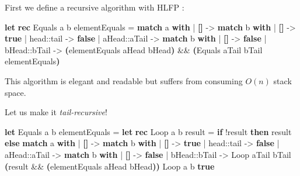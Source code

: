 \documentclass[
]{book}
\newenvironment{Shaded}{\begin{snugshade}}{\end{snugshade}}
\newcommand{\KeywordTok}[1]{\textcolor[rgb]{0.13,0.29,0.53}{\textbf{#1}}}
\newcommand{\NormalTok}[1]{#1}
\newcommand{\OperatorTok}[1]{\textcolor[rgb]{0.81,0.36,0.00}{\textbf{#1}}}
\begin{document}
First we define a recursive algorithm with HLFP :

\begin{Shaded}
\begin{Highlighting}[]
\KeywordTok{let} \KeywordTok{rec}\NormalTok{ Equals a b elementEquals = }
    \KeywordTok{match}\NormalTok{ a }\KeywordTok{with} 
\NormalTok{    | }\OperatorTok{[]}\NormalTok{ {-}\textgreater{} }\KeywordTok{match}\NormalTok{ b }\KeywordTok{with} 
\NormalTok{        | }\OperatorTok{[]}\NormalTok{ {-}\textgreater{} }\KeywordTok{true} 
\NormalTok{        | head::tail {-}\textgreater{} }\KeywordTok{false} 
\NormalTok{    | aHead::aTail {-}\textgreater{} }\KeywordTok{match}\NormalTok{ b }\KeywordTok{with} 
\NormalTok{        | }\OperatorTok{[]}\NormalTok{ {-}\textgreater{} }\KeywordTok{false} 
\NormalTok{        | bHead::bTail {-}\textgreater{} }\OperatorTok{(}\NormalTok{elementEquals aHead bHead}\OperatorTok{)}\NormalTok{ \&\& }\OperatorTok{(}\NormalTok{Equals aTail bTail elementEquals}\OperatorTok{)}
\end{Highlighting}
\end{Shaded}

This algorithm is elegant and readable but suffers from consuming \(O(n)\) stack space.

Let us make it \emph{tail-recursive}!

\begin{Shaded}
\begin{Highlighting}[]
\KeywordTok{let}\NormalTok{ Equals a b elementEquals = }
    \KeywordTok{let} \KeywordTok{rec}\NormalTok{ Loop a b result = }
        \KeywordTok{if}\NormalTok{ !result }\KeywordTok{then}\NormalTok{ result }\KeywordTok{else} 
            \KeywordTok{match}\NormalTok{ a }\KeywordTok{with} 
\NormalTok{            | }\OperatorTok{[]}\NormalTok{ {-}\textgreater{} }\KeywordTok{match}\NormalTok{ b }\KeywordTok{with} 
\NormalTok{                | }\OperatorTok{[]}\NormalTok{ {-}\textgreater{} }\KeywordTok{true} 
\NormalTok{                | head::tail {-}\textgreater{} }\KeywordTok{false} 
\NormalTok{            | aHead::aTail {-}\textgreater{} }\KeywordTok{match}\NormalTok{ b }\KeywordTok{with} 
\NormalTok{                | }\OperatorTok{[]}\NormalTok{ {-}\textgreater{} }\KeywordTok{false} 
\NormalTok{                | bHead::bTail {-}\textgreater{} Loop aTail bTail }\OperatorTok{(}\NormalTok{result \&\& }\OperatorTok{(}\NormalTok{elementEquals aHead bHead}\OperatorTok{))}
\NormalTok{    Loop a b }\KeywordTok{true}
\end{Highlighting}
\end{Shaded}


  
\end{document}
